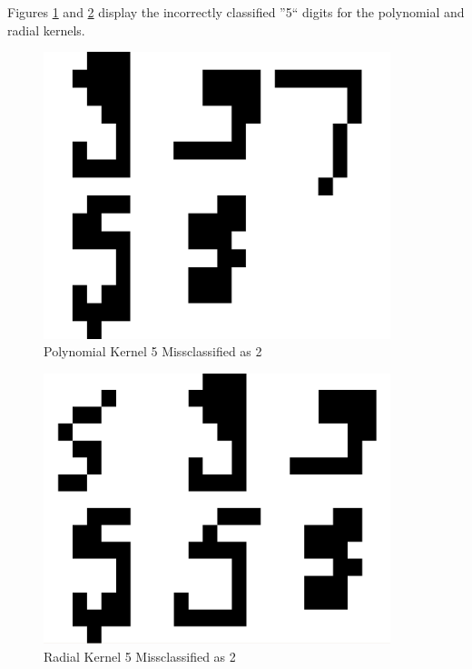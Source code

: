 \documentclass{article}
\begin{document}
Figures \ref{poly5errortest} and \ref{radial5errortest} display the incorrectly classified ''5`` digits for the polynomial and radial kernels.

\begin{figure}
\centering
\includegraphics[width=0.9\textwidth]{images/test2_5_correct5_class2_a0156.png}
\caption{Polynomial Kernel 5 Missclassified as 2}
\label{poly5errortest}
\end{figure}

\begin{figure}
\centering
\includegraphics[width=0.9\textwidth]{images/test2_5_correct5_class2_radial.png}
\caption{Radial Kernel 5 Missclassified as 2}
\label{radial5errortest}
\end{figure}
\end{document}
